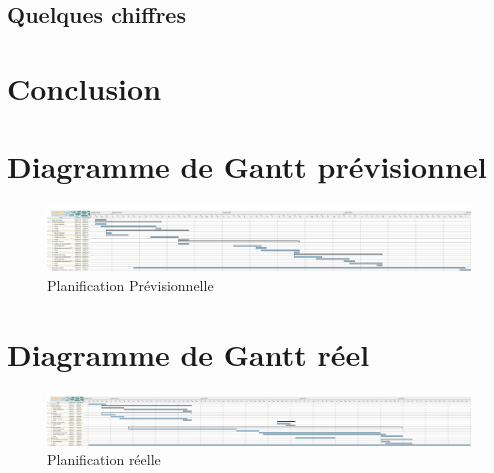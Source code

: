 \documentclass{report}
\begin{document}
\section{Quelques chiffres}
\hspace{0.5cm}

\chapter{Conclusion}



\appendix
\chapter{Diagramme de Gantt prévisionnel}
	\begin{figure}
		 \hspace{-4cm} 
			\includegraphics[scale=0.3]{../DiagrammePrevisionnel.png}
			\caption[Planification Prévisionnelle]{Planification Prévisionnelle}
	\end{figure}
	\medskip


\chapter{Diagramme de Gantt réel}
	\begin{figure}
		 \hspace{-4cm} 
			\includegraphics[scale=0.3]{../DiagrammeReel.png}
			\caption[Planification réelle]{Planification réelle}
	\end{figure}
	\medskip
\end{document}
